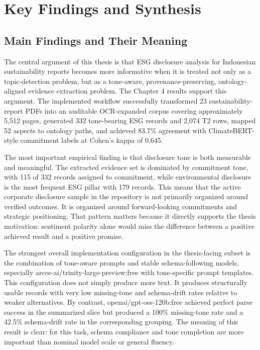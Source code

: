 \section{Key Findings and Synthesis}
\subsection{Main Findings and Their Meaning}

The central argument of this thesis is that ESG disclosure analysis for Indonesian sustainability reports becomes more informative when it is treated not only as a topic-detection problem, but as a tone-aware, provenance-preserving, ontology-aligned evidence extraction problem. The Chapter 4 results support this argument. The implemented workflow successfully transformed 23 sustainability-report PDFs into an auditable OCR-expanded corpus covering approximately 5,512 pages, generated 332 tone-bearing ESG records and 2,074 T2 rows, mapped 52 aspects to ontology paths, and achieved 83.7\% agreement with ClimateBERT-style commitment labels at Cohen’s kappa of 0.645.

The most important empirical finding is that disclosure tone is both measurable and meaningful. The extracted evidence set is dominated by commitment tone, with 115 of 332 records assigned to commitment, while environmental disclosure is the most frequent ESG pillar with 179 records. This means that the active corporate disclosure sample in the repository is not primarily organized around verified outcomes. It is organized around forward-looking commitments and strategic positioning. That pattern matters because it directly supports the thesis motivation: sentiment polarity alone would miss the difference between a positive achieved result and a positive promise.

The strongest overall implementation configuration in the thesis-facing subset is the combination of tone-aware prompts and stable schema-following models, especially arcee-ai/trinity-large-preview:free with tone-specific prompt templates. This configuration does not simply produce more text. It produces structurally usable records with very low missing-tone and schema-drift rates relative to weaker alternatives. By contrast, openai/gpt-oss-120b:free achieved perfect parse success in the summarized slice but produced a 100\% missing-tone rate and a 42.5\% schema-drift rate in the corresponding grouping. The meaning of this result is clear: for this task, schema compliance and tone completion are more important than nominal model scale or general fluency.

